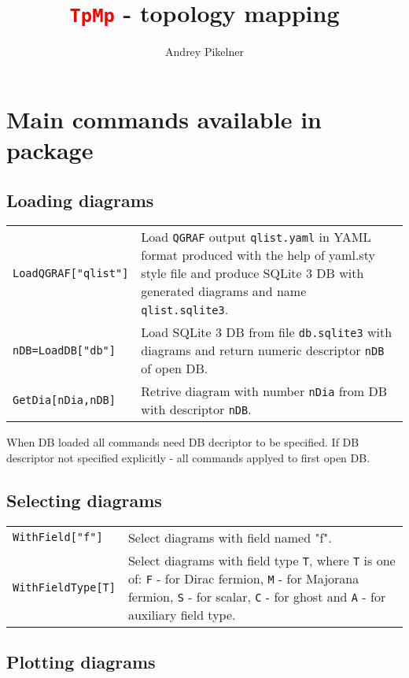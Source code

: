 \documentclass[a4paper,11pt]{article}
\title{\textcolor{red}{\texttt{\Huge TpMp}} - topology mapping}
\author{Andrey Pikelner}
\affil{II.~Institut f\"ur Theoretische Physik, Universit\"at Hamburg,\\
Luruper Chaussee 149, 22761 Hamburg, Germany}
\newcommand{\mma}[1]{\textcolor{BlueGreen}{\texttt{#1}}}
\begin{document}
 
\maketitle


\section*{Main commands available in package }

\subsection*{Loading diagrams}
\begingroup
\renewcommand\arraystretch{2}
\begin{longtable}{p{4cm}|p{11cm}}
  \mma{LoadQGRAF["qlist"]}
  & Load \texttt{QGRAF}\cite{Nogueira:1991ex} output \texttt{qlist.yaml} in YAML format produced with the help of
    yaml.sty style file and produce SQLite 3 DB with generated
    diagrams and name \texttt{qlist.sqlite3}.\\
  \mma{nDB=LoadDB["db"]}
  & Load SQLite 3 DB from file \texttt{db.sqlite3} with diagrams and
    return numeric descriptor \texttt{nDB} of open DB.\\
  \mma{GetDia[nDia,nDB]}
  & Retrive diagram with number \texttt{nDia} from DB with descriptor
    \texttt{nDB}.\\
\end{longtable}
\endgroup

When DB loaded all commands need DB decriptor to be specified. If DB
descriptor not specified explicitly - all commands applyed to first
open DB.

\subsection*{Selecting diagrams}

\begingroup
\renewcommand\arraystretch{2}
\begin{longtable}{p{4cm}|p{11cm}}
  \mma{WithField["f"]}
  & Select diagrams with field named "f".\\
  \mma{WithFieldType[T]}
  & Select diagrams with field type \texttt{T}, where \texttt{T} is
  one of: \texttt{F} - for Dirac fermion, \texttt{M} - for Majorana
  fermion, \texttt{S} - for scalar, \texttt{C} - for ghost and
  \texttt{A} - for auxiliary field type.\\
\end{longtable}
\endgroup

\subsection*{Plotting diagrams}



 
\end{document}
